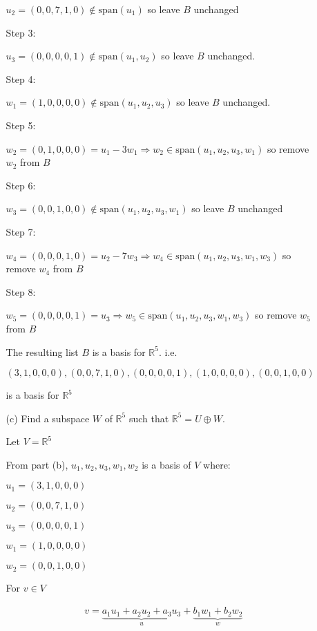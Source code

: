 \documentclass[fleqn]{article}
\begin{document}
\begin{enumerate}[nolistsep]
\begin{enumerate}[nolistsep]
				$u_2 = (0, 0, 7, 1, 0) \not\in \text{span}(u_1)$ so leave $B$ unchanged
				
				Step 3: 
				
				$u_3 = (0, 0, 0, 0, 1) \not\in \text{span}(u_1, u_2)$ so leave $B$ unchanged.
				
				Step 4: 
				
				$w_1 = (1, 0, 0, 0, 0) \not\in \text{span}(u_1, u_2, u_3)$ so leave $B$ unchanged.
				
				Step 5: 
				
				$w_2 = (0, 1, 0, 0, 0) = u_1 - 3w_1 \Rightarrow w_2 \in \text{span}(u_1, u_2, u_3, w_1)$ so remove $w_2$ from $B$
				
				Step 6: 
				
				$w_3 = (0, 0, 1, 0, 0) \not\in \text{span}(u_1, u_2, u_3, w_1)$ so leave $B$ unchanged
				
				Step 7: 
				
				$w_4 = (0, 0, 0, 1, 0) = u_2 - 7w_3 \Rightarrow w_4 \in \text{span}(u_1, u_2, u_3, w_1, w_3)$ so remove $w_4$ from $B$
				
				Step 8: 
				
				$w_5 = (0, 0, 0, 0, 1) = u_3 \Rightarrow w_5 \in \text{span}(u_1, u_2, u_3, w_1, w_3)$ so remove $w_5$ from $B$
				
				The resulting list $B$ is a basis for $\mathbb{R}^5$. i.e. 
				
				$(3, 1, 0, 0, 0), (0, 0, 7, 1, 0), (0, 0, 0, 0, 1), (1, 0, 0, 0, 0), (0, 0, 1, 0, 0)$
				
				is a basis for $\mathbb{R}^5$
					
				\item[(c)] Find a subspace $W$ of $\mathbb{R}^5$ such that $\mathbb{R}^5 = U \oplus W$.
				
				Let $V = \mathbb{R}^5$
				
				From part (b), $u_1, u_2, u_3, w_1, w_2$ is a basis of $V$ where:
				
				$u_1 = (3, 1, 0, 0, 0)$
				
				$u_2 = (0, 0, 7, 1, 0)$
				
				$u_3 = (0, 0, 0, 0, 1)$
				
				$w_1 = (1, 0, 0, 0, 0)$
				
				$w_2 = (0, 0, 1, 0, 0)$
				
				For $v \in V$
				
				\begin{align*}
				v = \underbrace{a_1u_1 + a_2u_2 + a_3u_3}_{u} + \underbrace{b_1w_1 + b_2w_2}_{w}
				\end{align*}
				

\end{enumerate}
\end{enumerate}
\end{document}
